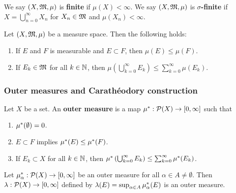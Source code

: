 \documentclass[a4paper]{article}
\renewcommand{\cupinfn}{\bigcup_{n=0}^\infty}
\renewcommand{\cupinfk}{\bigcup_{k=0}^\infty}
\renewcommand{\suminfk}{\sum_{k=0}^\infty}
\begin{document}
\begin{defi}
  We say $(X, \mf, \mu)$ is \textbf{finite} if $\mu(X) < \infty$. We say
  $(X, \mf, \mu)$ is \textbf{$\sigma$-finite} if $X = \cupinfn X_n$ for
  $X_n \in \mf$ and $\mu(X_n) < \infty$.
\end{defi}

\begin{thm}
  Let $(X, \mf, \mu)$ be a measure space. Then the following holds:
  \begin{enumerate}
    \item If $E$ and $F$ is measurable and $E \subset F$, then $\mu(E)
          \leq \mu(F)$.

    \item If $E_k \in \mf$ for all $k \in \N$, then $\mu \left( \cupinfk
          E_k \right) \leq \suminfk \mu(E_k)$.
  \end{enumerate}
\end{thm}

\subsubsection{Outer measures and Carath\'eodory construction}

\begin{defi}
  Let $X$ be a set. An \textbf{outer measure} is a map
  $\om: \P(X) \to [0, \infty]$ such that
  \begin{enumerate}
    \item $\om(\emptyset) = 0$.
    \item $E \subset F$ implies $\om(E) \leq \om(F)$.
    \item If $E_k \subset X$ for all $k \in \N$, then $\om \left( \cupinfk
          E_k \right) \leq \suminfk \om(E_k)$.
  \end{enumerate}
\end{defi}

\begin{prop}
  Let $\om_\alpha: \P(X) \to [0, \infty]$ be an outer measure for all
  $\alpha \in A \neq \emptyset$. Then $\lambda: \P(X) \to [0, \infty]$
  defined by $\lambda(E) = \sup_{\alpha \in A} \om_\alpha(E)$ is an outer
  measure.
\end{prop}
\end{document}
